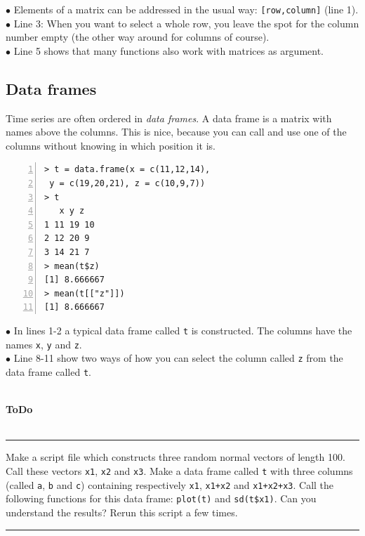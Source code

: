 \documentclass[a4paper,11pt,twocolumn,tablecaptionabove]{scrartcl}
\newenvironment{ToDo} {%
  \begin{flushright}
    \hfill
    \begin{minipage}{0.95\columnwidth}         %
    \textsf{\textbf{ToDo}} \\
      \vspace{-0.85cm}\\
      {\color{Gray}\rule[-0.1cm]{\columnwidth}{1.5pt}}} { %
      {\color{Gray} \rule[0.3cm]{\columnwidth}{1.5pt}}
    \end{minipage}
    \vspace{1em}
  \end{flushright}
  }
\begin{document}
\noindent $\bullet$ Elements of a matrix can be addressed in the usual way: \texttt{[row,column]} (line 1). \\
\noindent $\bullet$ Line 3: When you want to select a whole row, you leave the spot for the column number empty (the other way around for columns of course).\\
\noindent $\bullet$ Line 5 shows that many functions also work with matrices as argument.\\

\subsection{Data frames}

Time series are often ordered in \emph{data frames}. A data frame is a matrix with names above the columns. This is nice, because you can call and use one of the columns without knowing in which position it is.
\begin{Verbatim}[frame=single,numbers=left,gobble=0, xleftmargin=0.35cm, numbersep=0.1cm]
> t = data.frame(x = c(11,12,14),
 y = c(19,20,21), z = c(10,9,7))
> t
   x y z
1 11 19 10
2 12 20 9 
3 14 21 7  
> mean(t$z)
[1] 8.666667
> mean(t[["z"]])
[1] 8.666667
\end{Verbatim}

\noindent $\bullet$ In lines 1-2 a typical data frame called \texttt{t} is constructed. The columns have the names \texttt{x}, \texttt{y} and \texttt{z}.\\
\noindent $\bullet$ Line 8-11 show two ways of how you can select the column called \texttt{z} from the data frame called \texttt{t}.\\
\\

\begin{ToDo}
Make a script file which constructs three random normal vectors of length 100. Call these vectors \texttt{x1}, \texttt{x2} and \texttt{x3}. Make a data frame called \texttt{t} with three columns (called \texttt{a}, \texttt{b} and \texttt{c}) containing respectively \texttt{x1}, \texttt{x1+x2} and \texttt{x1+x2+x3}. Call the following functions for this data frame: \texttt{plot(t)} and \texttt{sd(t\$x1)}. Can you understand the results? Rerun this script a few times.\\
\end{ToDo}

\end{document}
